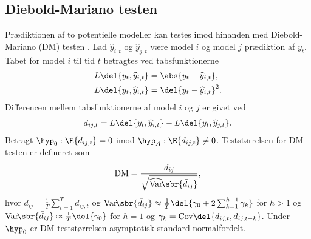 \subsection{Diebold-Mariano testen}
Prædiktionen af to potentielle modeller kan testes imod hinanden med Diebold-Mariano (DM) testen \citep{dmtest}.
Lad \(\widehat{y}_{i,t}\) og \(\widehat{y}_{j,t}\) være model \(i\) og model \(j\) prædiktion af \(y_{t}\).
Tabet for model \(i\) til tid \(t\) betragtes ved tabsfunktionerne
\begin{align}
L \del{y_t, \widehat{y}_{i,t}} &= \abs{y_t - \widehat{y}_{i,t}}, \label{eq:lossMAE} \\
L \del{y_t, \widehat{y}_{i,t}} &= \del{y_t - \widehat{y}_{i,t}}^2. \label{eq:lossMSE}
\end{align}
Differencen mellem tabsfunktionerne af model \(i\) og \(j\) er givet ved 
\begin{align*}
d_{ij,t} = L \del{y_t, \widehat{y}_{i,t}} - L \del{y_t, \widehat{y}_{j,t}}.
\end{align*}
%
Betragt \(\hyp_0 : \E{d_{ij,t}} = 0\) imod \(\hyp_A: \E{d_{ij,t}} \neq 0\). Teststørrelsen for DM testen er defineret som
\begin{align*}
\text{DM} = \frac{\bar{d}_{ij}}{\sqrt{\widehat{\mathrm{Var}}\!\sbr{\bar{d}_{ij}}}},
\end{align*}
hvor \(\bar{d}_{ij} = \frac{1}{T} \sum_{t = 1}^T d_{ij,t}\) og 
\(\mathrm{Var}\!\sbr{\bar{d}_{ij}} \approx \frac{1}{T} \del{\gamma_0 + 2 \sum_{k=1}^{h-1} \gamma_k}\) for \(h > 1 \) og \(\mathrm{Var}\!\sbr{\bar{d}_{ij}} \approx \frac{1}{T} \del{\gamma_0}\) for \(h = 1\) og \(\gamma_k = \text{Cov} \del{d_{ij,t}, d_{ij,t-k}}\). 
%
Under \(\hyp_0\) er DM teststørrelsen asymptotisk standard normalfordelt. 

